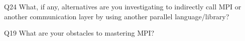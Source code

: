 \begin{description}%
\item{Q24} What, if any, alternatives are you investigating to indirectly call MPI or another communication layer by using another parallel language/library?%
\item{Q19} What are your obstacles to mastering MPI?%
\end{description}%
